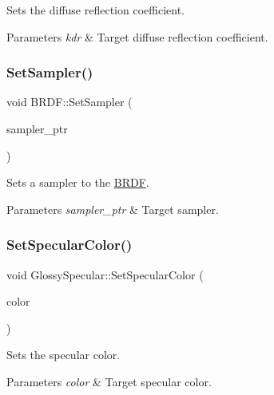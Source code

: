 Sets the diffuse reflection coefficient. 
\begin{DoxyParams}{Parameters}
{\em kdr} & Target diffuse reflection coefficient. \\
\hline
\end{DoxyParams}
\hypertarget{group___b_r_d_f_ga77a2a5e48ca3093d853e5713afa01108}{}\label{group___b_r_d_f_ga77a2a5e48ca3093d853e5713afa01108} 
\subsubsection{\texorpdfstring{Set\+Sampler()}{SetSampler()}}
{\footnotesize\ttfamily void B\+R\+D\+F\+::\+Set\+Sampler (\begin{DoxyParamCaption}\item[{std\+::shared\+\_\+ptr$<$ \hyperlink{class_sampler}{Sampler} $>$}]{sampler\+\_\+ptr }\end{DoxyParamCaption})\hspace{0.3cm}{\ttfamily [inline]}}

Sets a sampler to the \hyperlink{class_b_r_d_f}{B\+R\+DF}. 
\begin{DoxyParams}{Parameters}
{\em sampler\+\_\+ptr} & Target sampler. \\
\hline
\end{DoxyParams}
\hypertarget{group___b_r_d_f_ga4bc78448419beb3d49ae4a9d96a8c5ad}{}\label{group___b_r_d_f_ga4bc78448419beb3d49ae4a9d96a8c5ad} 
\subsubsection{\texorpdfstring{Set\+Specular\+Color()}{SetSpecularColor()}}
{\footnotesize\ttfamily void Glossy\+Specular\+::\+Set\+Specular\+Color (\begin{DoxyParamCaption}\item[{const \hyperlink{class_r_g_b_color}{R\+G\+B\+Color} \&}]{color }\end{DoxyParamCaption})\hspace{0.3cm}{\ttfamily [inline]}}

Sets the specular color. 
\begin{DoxyParams}{Parameters}
{\em color} & Target specular color. \\
\hline
\end{DoxyParams}
\hypertarget{group___b_r_d_f_ga06b9d29c576be7fcacef68edb57cfc23}{}\label{group___b_r_d_f_ga06b9d29c576be7fcacef68edb57cfc23} 
